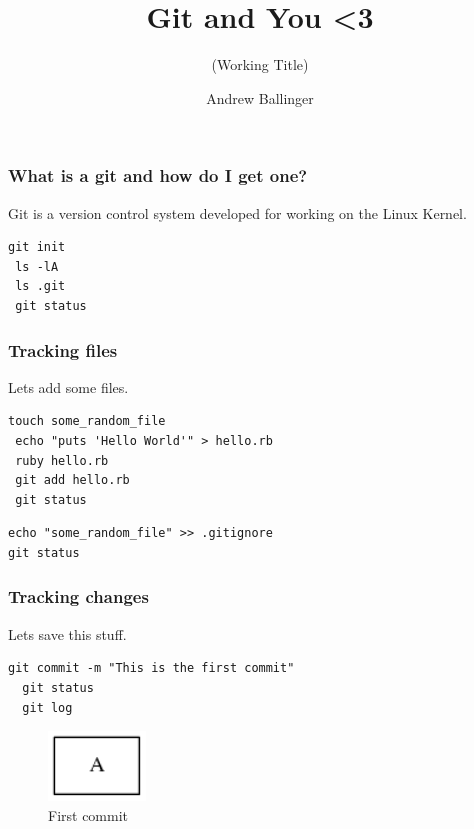 \documentclass{beamer}
\title{ Git and You <3 }
\subtitle{(Working Title)}
\author{Andrew Ballinger}
\begin{document}
\frame{\titlepage}

\begin{frame}[fragile]
\frametitle{What is a git and how do I get one?}
Git is a version control system developed for working on the Linux Kernel.

\vspace{1em}

\begin{lstlisting}[frame=single]
 git init
 ls -lA
 ls .git
 git status
\end{lstlisting}

\end{frame}

\begin{frame}[fragile]
\frametitle{Tracking files}

Lets add some files.

\vspace{1em}

\begin{lstlisting}[frame=single]
 touch some_random_file
 echo "puts 'Hello World'" > hello.rb
 ruby hello.rb
 git add hello.rb
 git status
\end{lstlisting}

\vspace{1em}

\begin{lstlisting}[frame=single]
echo "some_random_file" >> .gitignore
git status
\end{lstlisting}

\end{frame}

\begin{frame}[fragile]
\frametitle{Tracking changes}

Lets save this stuff.

\vspace{1em}

\begin{lstlisting}[frame=single]
  git commit -m "This is the first commit"
  git status
  git log
\end{lstlisting}

\begin{figure}[p]
  \centering
  \includegraphics[height=5em]{first_commit.png}
  \caption{First commit}
\end{figure}

\end{frame}
\end{document}
